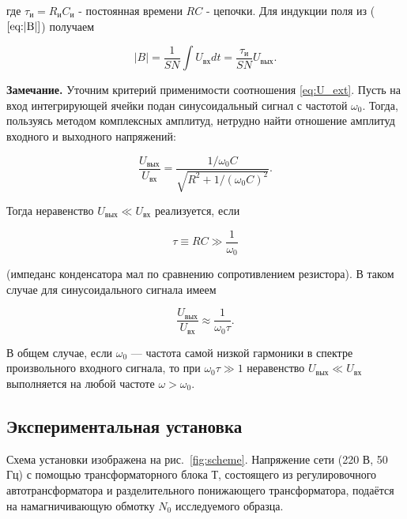 \documentclass[a4paper, 12pt]{article}
\begin{document}
где $\tau_\text{и}=R_\text{и}C_\text{и}$ - постоянная времени $ RC $ - цепочки. Для индукции поля из ($\ref{eq:|B|}$) получаем 

\begin{equation}
|B|=\frac{1}{SN}\int U_{\text{вх}} dt=\frac{\tau_\text{и}}{SN}U_{\text{вых}}.
\label{eq:|B|new}
\end{equation}

\textbf{Замечание.} Уточним критерий применимости соотношения \eqref{eq:U_ext}. Пусть на вход интегрирующей ячейки подан синусоидальный сигнал с частотой $\omega_0$. Тогда, пользуясь методом комплексных амплитуд, нетрудно найти отношение амплитуд входного и выходного напряжений:

\begin{equation}
\frac{U_{\text{вых}}}{U_{\text{вх}}}=\frac{1/\omega_0C}{\sqrt{R^2+1/(\omega_0C)^2}}.
\end{equation}

Тогда неравенство $U_{\text{вых}} \ll U_{\text{вх}}$ реализуется, если 

\begin{equation} \label{eq:tauone}
\tau \equiv RC\gg \frac{1}{\omega_0}
\end{equation}

(импеданс конденсатора мал по сравнению сопротивлением резистора).
В таком случае для синусоидального сигнала имеем

\begin{equation}\label{eq:tautwo}
\frac{U_{\text{вых}}}{U_{\text{вх}}}\approx\frac{1}{\omega_0\tau}.
\end{equation}

В общем случае, если $\omega_0$ — частота самой низкой гармоники в спектре
произвольного входного сигнала, то при $\omega_0\tau \gg 1$ неравенство $U_{\text{вых}} \ll U_{\text{вх}}$ выполняется на любой частоте $\omega > \omega_0$.

\subsection{Экспериментальная установка}

Схема установки изображена на рис.~\ref{fig:scheme}. Напряжение сети (220 В,
50 Гц) с помощью трансформаторного блока Т, состоящего из регулировочного автотрансформатора и разделительного понижающего трансформатора, подаётся на намагничивающую обмотку $N_0$ исследуемого образца.
\end{document}
